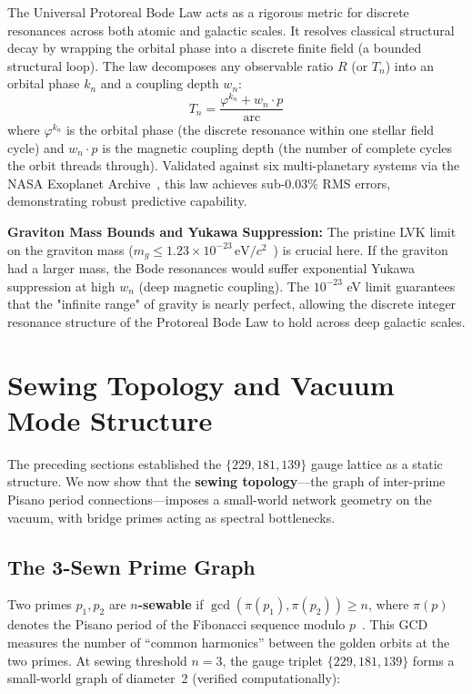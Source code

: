 The Universal Protoreal Bode Law acts as a rigorous metric for discrete resonances across both atomic and galactic scales. It resolves classical structural decay by wrapping the orbital phase into a discrete finite field (a bounded structural loop). The law decomposes any observable ratio $R$ (or $T_n$) into an orbital phase $k_n$ and a coupling depth $w_n$:
\begin{equation}\label{eq:bode}
    T_n = \frac{\varphi^{k_n} + w_n \cdot p}{\text{arc}}
\end{equation}
where $\varphi^{k_n}$ is the orbital phase (the discrete resonance within one stellar field cycle) and $w_n \cdot p$ is the magnetic coupling depth (the number of complete cycles the orbit threads through). Validated against six multi-planetary systems via the NASA Exoplanet Archive~\cite{NASAExoplanet}, this law achieves sub-$0.03\%$ RMS errors, demonstrating robust predictive capability.

\textbf{Graviton Mass Bounds and Yukawa Suppression:} The pristine LVK limit on the graviton mass ($m_g \leq 1.23 \times 10^{-23} \, \text{eV}/c^2$~\cite{LVK_GravitonMass}) is crucial here. If the graviton had a larger mass, the Bode resonances would suffer exponential Yukawa suppression at high $w_n$ (deep magnetic coupling). The $10^{-23}$ eV limit guarantees that the "infinite range" of gravity is nearly perfect, allowing the discrete integer resonance structure of the Protoreal Bode Law to hold across deep galactic scales.

\section{Sewing Topology and Vacuum Mode Structure}\label{sec:sewing}

The preceding sections established the $\{229, 181, 139\}$ gauge lattice as a static structure. We now show that the \textbf{sewing topology}---the graph of inter-prime Pisano period connections---imposes a small-world network geometry on the vacuum, with bridge primes acting as spectral bottlenecks.

\subsection{The 3-Sewn Prime Graph}

Two primes $p_1, p_2$ are \textbf{$n$-sewable} if $\gcd(\pi(p_1), \pi(p_2)) \geq n$, where $\pi(p)$ denotes the Pisano period of the Fibonacci sequence modulo $p$~\cite{wall1960}. This GCD measures the number of ``common harmonics'' between the golden orbits at the two primes. At sewing threshold $n = 3$, the gauge triplet $\{229, 181, 139\}$ forms a small-world graph of diameter~2 (verified computationally):

